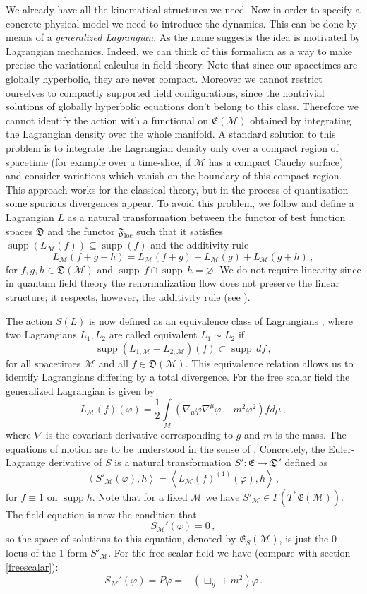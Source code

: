 \documentclass[11pt]{article}
\newcommand{\E}{\mathfrak{E}}
\newcommand{\D}{\mathfrak{D}}
\newcommand{\F}{\mathfrak{F}}
\newcommand{\Mcal}{\mathcal{M}}
\DeclareMathOperator{\supp}{\mathrm{supp}}      %
\newcommand{\loc}{\mathrm{loc}}
\newcommand{\ph}{\varphi}
\newcommand{\1}{\mathds{1}}                         %
\newcommand{\be}{\begin{equation}}
\newcommand{\ee}{\end{equation}}
\begin{document}
{We already have  all the kinematical structures we need. Now in order to specify a concrete physical model we need to introduce the dynamics. This can be done by means of 
a \textit{generalized Lagrangian}. As the name suggests the idea is motivated by Lagrangian mechanics. Indeed, we can think of this formalism as a way to make precise the variational calculus
in field theory. Note that since our spacetimes are globally hyperbolic, they are never compact. Moreover we cannot restrict ourselves to compactly supported field configurations, since the nontrivial solutions of globally hyperbolic equations don't belong to this class. Therefore we cannot identify the action with a functional on $\E(\Mcal)$ obtained 
by integrating the Lagrangian density over the whole manifold. A standard solution to this problem is to integrate the  Lagrangian density only over a compact region of spacetime (for example over a time-slice, if $\Mcal$ has a compact Cauchy surface) and consider variations which vanish on the boundary of this compact region. This approach works for the classical theory, but in the process of quantization some spurious divergences appear. To avoid this problem, we follow \cite{BDF} and define a Lagrangian $L$ as a natural transformation between the functor of test function spaces $\D$ and the functor $\F_\loc$ such that it satisfies $\supp(L_\Mcal(f))\subseteq \supp(f)$ and the additivity rule 
\[
L_\Mcal(f+g+h)=L_\Mcal(f+g)-L_\Mcal(g)+L_\Mcal(g+h)\,,
\]
for $f,g,h\in\D(\Mcal)$ and $\supp\,f\cap\supp\,h=\varnothing$. We do not require linearity since in quantum field theory the renormalization flow does not preserve the linear structure; it respects, however, the additivity rule (see \cite{BDF}).

The action $S(L)$ is now defined as an equivalence class of Lagrangians  \cite{BDF}, where two Lagrangians $L_1,L_2$ are called equivalent $L_1\sim L_2$  if
\be\label{equ}
\supp (L_{1,\Mcal}-L_{2,\Mcal})(f)\subset\supp\, df\,, 
\ee
for all spacetimes $\Mcal$ and all $f\in\D(\Mcal)$. 
This equivalence relation allows us to identify Lagrangians differing by a total divergence.  For the free scalar field the generalized Lagrangian is given by
\be\label{Lscalar}
L_\Mcal(f)(\ph)=\frac{1}{2}\int\limits_M (\nabla_\mu\ph\nabla^\mu\ph-m^2\ph^2)fd\mu\,,
\ee
where $\nabla$ is the covariant derivative corresponding to $g$ and $m$ is the mass. The equations of motion are to be understood in the sense of \cite{BDF}. Concretely, the Euler-Lagrange derivative of $S$ is a natural transformation $S':\E\to\D'$ defined as
\be\label{ELd}
\left<S'_\Mcal(\ph),h\right>=\left<L_\Mcal(f)^{(1)}(\ph),h\right>\,,
 \ee
for $f\equiv 1$ on $\supp h$. Note that for a fixed $\Mcal$ we have $S'_{\Mcal}\in\Gamma(T^*\E(\Mcal))$. The field equation is now the condition that
\be
 S_\Mcal'(\ph)=0\label{eom}\,,
\ee
so the space of solutions to this equation, denoted by $\E_S(\Mcal)$, is just the 0 locus of the 1-form $S'_{\Mcal}$. For the free scalar field we have (compare with section \eqref{freescalar}):
\[
 S_\Mcal'(\ph)=P\ph=-(\Box_g+m^2)\ph\,.
\]
 
}
\end{document}

